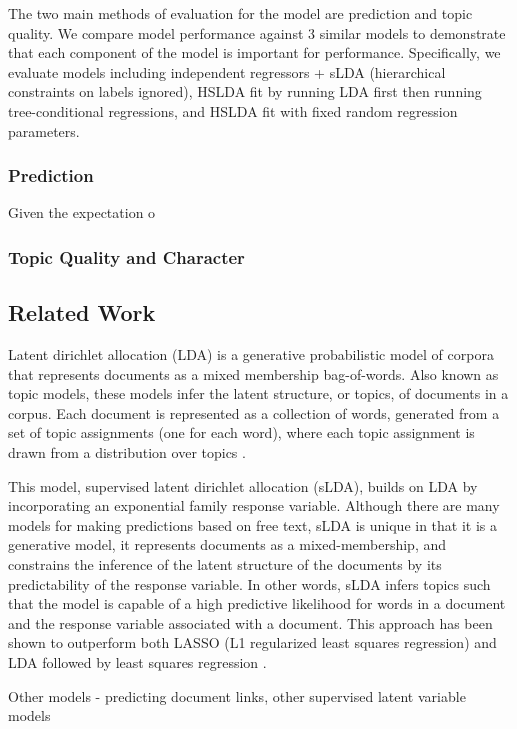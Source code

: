 \documentclass{article}
\begin{document}
The two main methods of evaluation for the model are prediction and
topic quality. We compare model performance against 3 similar models
to demonstrate that each component of the model is important for performance.
Specifically, we evaluate models including independent regressors
+ sLDA (hierarchical constraints on labels ignored), HSLDA fit by
running LDA first then running tree-conditional regressions, and HSLDA
fit with fixed random regression parameters.


\subsubsection{Prediction}

Given the expectation o


\subsubsection{Topic Quality and Character}




\subsection{Related Work}
\label{sec:related_work}
Latent dirichlet allocation (LDA) is a generative probabilistic model
of corpora that represents documents as a mixed membership bag-of-words.
Also known as topic models, these models infer the latent structure,
or topics, of documents in a corpus. Each document is represented
as a collection of words, generated from a set of topic assignments
(one for each word), where each topic assignment is drawn from a distribution
over topics \citep{Blei2003}.

This model, supervised latent dirichlet allocation (sLDA), builds
on LDA by incorporating an exponential family response variable. Although
there are many models for making predictions based on free text, sLDA
is unique in that it is a generative model, it represents documents
as a mixed-membership, and constrains the inference of the latent
structure of the documents by its predictability of the response variable.
In other words, sLDA infers topics such that the model is capable
of a high predictive likelihood for words in a document and the response
variable associated with a document. This approach has been shown
to outperform both LASSO (L1 regularized least squares regression)
and LDA followed by least squares regression \citep{BleiMcAuliffe2008}.

Other models - predicting document links, other supervised latent
variable models
\end{document}
